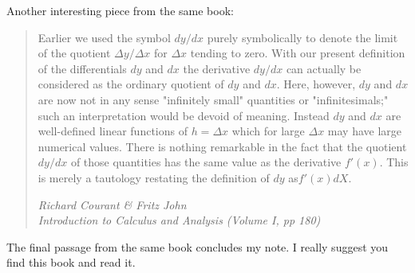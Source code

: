 \documentclass[11pt,a4paper]{article}
\begin{document}
Another interesting piece from the same book:

\begin{quote}
	Earlier we used the symbol $dy/dx$ purely symbolically to denote the
	limit of the quotient $\Delta y / \Delta x$ for $\Delta x$ tending to zero. With our present
	definition of the differentials $dy$ and $dx$ the derivative $dy/dx$ can actually
	be considered as the ordinary quotient of $dy$ and $dx$. Here, however,
	$dy$ and $dx$ are now not in any sense "infinitely small" quantities or
	"infinitesimals;" such an interpretation would be devoid of meaning.
	Instead $dy$ and $dx$ are well-defined linear functions of $h = \Delta x$ which for
	large $\Delta x$ may have large numerical values. There is nothing remarkable
	in the fact that the quotient $dy/dx$ of those quantities has the same value
	as the derivative $f'(x)$. This is merely a tautology restating the definition
	of $dy$ as$ f'(x) dX$.
	
	\textit{Richard Courant \& Fritz John \\ 
		Introduction to Calculus and Analysis (Volume I, pp 180)}
\end{quote}

The final passage from the same book concludes my note. I really suggest you find this book and read it.
\end{document}
